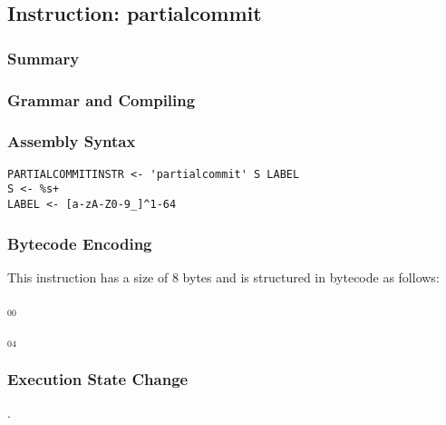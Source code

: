 \subsection{Instruction: partialcommit}

\subsubsection{Summary}


\subsubsection{Grammar and Compiling}


\subsubsection{Assembly Syntax}

\begin{myquote}
\begin{verbatim}
PARTIALCOMMITINSTR <- 'partialcommit' S LABEL
S <- %s+
LABEL <- [a-zA-Z0-9_]^1-64
\end{verbatim}
\end{myquote}


\subsubsection{Bytecode Encoding}

This instruction has a size of 8 bytes and is structured in bytecode as follows:

$_{00}$\ 



$_{04}$\ 


\subsubsection{Execution State Change}

.



